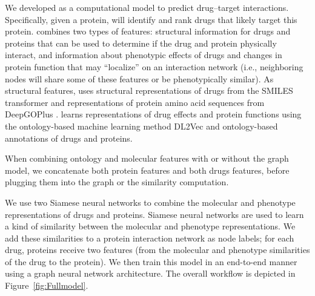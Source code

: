 \documentclass{bioinfo}
\renewcommand{\cite}{\citep}
\begin{document}
We developed \name as a computational model to predict drug--target
interactions. Specifically, given a protein, \name will identify and
rank drugs that likely target this protein. \name combines two types
of features: structural information for drugs and proteins that can be
used to determine if the drug and protein physically interact, and
information about phenotypic effects of drugs and changes in protein
function that may ``localize'' on an interaction network (i.e.,
neighboring nodes will share some of these features or be
phenotypically similar).  As structural features, \name uses
structural representations of drugs from the SMILES transformer
\cite{SmilesTransformer} and representations of protein amino acid
sequences from DeepGOPlus \cite{DeepGoPlus}.  \name learns
representations of drug effects and protein functions using the
ontology-based machine learning method DL2Vec \cite{DL2vec2020} and
ontology-based annotations of drugs and proteins.

When combining ontology and molecular features with or without the
graph model, we concatenate both protein features and both drugs
features, before plugging them into the graph or the similarity
computation.

We use two Siamese neural networks to combine the molecular and
phenotype representations of drugs and proteins. Siamese neural
networks are used to learn a kind of similarity between the molecular
and phenotype representations. We add these similarities to a protein
interaction network as node labels; for each drug, proteins receive
two features (from the molecular and phenotype similarities of the
drug to the protein).
We then train this model in an end-to-end manner using a graph neural
network architecture.  The overall workflow is depicted in Figure~\ref{fig:Fullmodel}.


\end{document}
